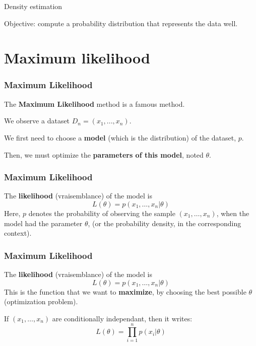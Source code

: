 \documentclass[usenames,dvipsnames,french]{beamer}
\begin{document}
\frame{\titlepage}

\begin{frame}
    \tableofcontents
\end{frame}

\begin{frame}{Density estimation}

    Objective: compute a probability distribution that represents the data well.

\end{frame}

\section{Maximum likelihood}

\begin{frame}
\frametitle{Maximum Likelihood}
The \textbf{Maximum Likelihood} method is a famous method.

We observe a dataset $D_n = (x_1,...,x_n)$.

We first need to choose a \textbf{model} (which is the distribution) of the dataset, $p$.

Then, we must optimize the \textbf{parameters of this model}, noted $\theta$.
\end{frame}

\begin{frame}
    \frametitle{Maximum Likelihood}
    The \textbf{{likelihood}} (vraisemblance)  of the model is 
    \begin{equation}
        L(\theta)=p(x_1, \dots, x_n| \theta)
    \end{equation}
    Here, $p$ denotes the probability of observing the sample $(x_1, \dots, x_n)$, when the model had the parameter $\theta$, (or the probability density, in the corresponding context).
\end{frame}

\begin{frame}
    \frametitle{Maximum Likelihood}
    The \textbf{{likelihood}} (vraisemblance)  of the model is 
    \begin{equation}
        L(\theta)=p(x_1, \dots, x_n| \theta)
    \end{equation}
    This is the function that we want to \textbf{maximize}, by choosing the best possible $\theta$ (optimization problem).

    If $(x_1, \dots, x_n)$ are conditionally independant, then it writes:
    \begin{equation}
        L(\theta)=\prod_{i=1}^np(x_i|\theta)
    \end{equation}

\end{frame}
\end{document}
